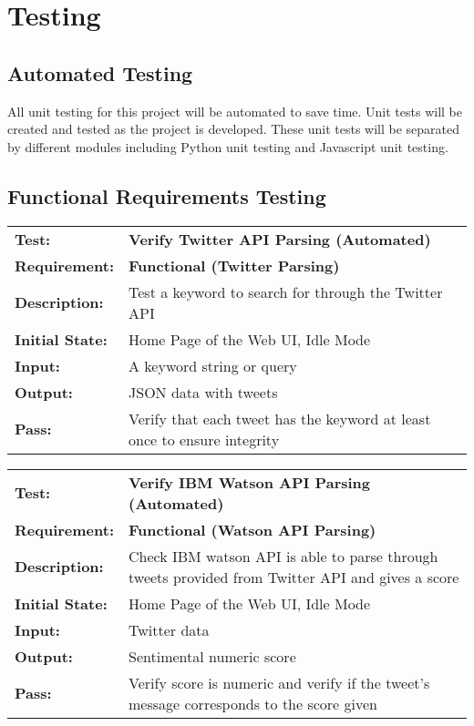 \documentclass{article}
\begin{document}


\newpage 

\section{Testing}


	\subsection{Automated Testing}
	All unit testing for this project will be automated to save time. Unit tests will be created and tested as the project is developed. These unit tests will be separated by different modules including Python unit testing and Javascript unit testing.

	\newpage

	\subsection{Functional Requirements Testing}

	\begin{mdframed}[linewidth=1pt] %
	\begin{tabularx}{\textwidth}{@{}p{3cm}X@{}}
	{\bf Test:} & {\bf Verify Twitter API Parsing (Automated)}\\[\baselineskip]
	{\bf Requirement:} & {\bf Functional (Twitter Parsing)}\\[\baselineskip]
	{\bf Description:} & Test a keyword to search for through the Twitter API \\[0.5\baselineskip]
	{\bf Initial State:} & Home Page of the Web UI, Idle Mode\\[0.5\baselineskip]
	{\bf Input:} &  A keyword string or query\\[0.5\baselineskip]
	{\bf Output:} & JSON data with tweets\\[0.5\baselineskip]
	{\bf Pass:} & Verify that each tweet has the keyword at least once to ensure integrity
	\end{tabularx}
	\end{mdframed}

	\begin{mdframed}[linewidth=1pt]%
	\begin{tabularx}{\textwidth}{@{}p{3cm}X@{}}
	{\bf Test:} & {\bf Verify IBM Watson API Parsing (Automated)}\\[\baselineskip]
	{\bf Requirement:} & {\bf Functional (Watson API Parsing)}\\[\baselineskip]
	{\bf Description:} & Check IBM watson API is able to parse through tweets provided from Twitter API and gives a score \\[0.5\baselineskip]
	{\bf Initial State:} &  Home Page of the Web UI, Idle Mode\\[0.5\baselineskip]
	{\bf Input:} &  Twitter data\\[0.5\baselineskip]
	{\bf Output:} & Sentimental numeric score\\[0.5\baselineskip]
	{\bf Pass:} & Verify score is numeric and verify if the tweet's message corresponds to the score given
	\end{tabularx}
	\end{mdframed}
\end{document}
